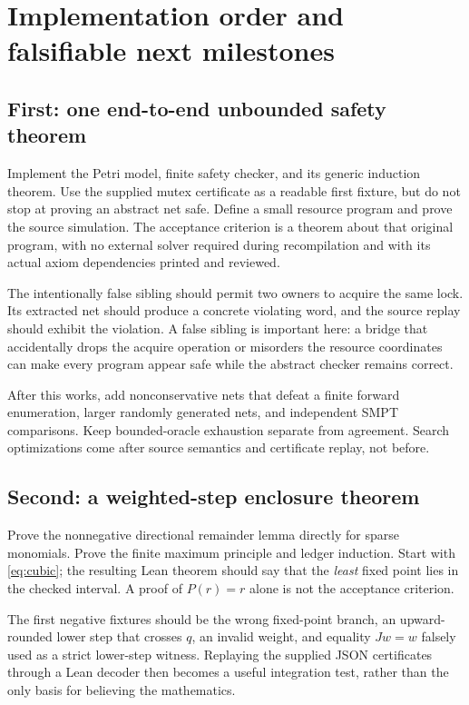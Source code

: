 \documentclass[11pt,a4paper]{article}
\theoremstyle{definition}\newtheorem{definition}[theorem]{Definition}
\theoremstyle{remark}\newtheorem{remark}[theorem]{Remark}
\begin{document}


\section{Implementation order and falsifiable next milestones}
\subsection{First: one end-to-end unbounded safety theorem}
Implement the Petri model, finite safety checker, and its generic induction theorem. Use the supplied mutex certificate as a readable first fixture, but do not stop at proving an abstract net safe. Define a small resource program and prove the source simulation. The acceptance criterion is a theorem about that original program, with no external solver required during recompilation and with its actual axiom dependencies printed and reviewed.

The intentionally false sibling should permit two owners to acquire the same lock. Its extracted net should produce a concrete violating word, and the source replay should exhibit the violation. A false sibling is important here: a bridge that accidentally drops the acquire operation or misorders the resource coordinates can make every program appear safe while the abstract checker remains correct.

After this works, add nonconservative nets that defeat a finite forward enumeration, larger randomly generated nets, and independent SMPT comparisons. Keep bounded-oracle exhaustion separate from agreement. Search optimizations come after source semantics and certificate replay, not before.

\subsection{Second: a weighted-step enclosure theorem}
Prove the nonnegative directional remainder lemma directly for sparse monomials. Prove the finite maximum principle and ledger induction. Start with \eqref{eq:cubic}; the resulting Lean theorem should say that the \emph{least} fixed point lies in the checked interval. A proof of $P(r)=r$ alone is not the acceptance criterion.

The first negative fixtures should be the wrong fixed-point branch, an upward-rounded lower step that crosses $q$, an invalid weight, and equality $Jw=w$ falsely used as a strict lower-step witness. Replaying the supplied JSON certificates through a Lean decoder then becomes a useful integration test, rather than the only basis for believing the mathematics.
\end{document}
